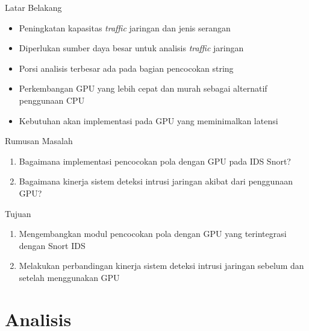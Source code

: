 \documentclass[10pt,xcolor=table]{beamer}
\begin{document}
\begin{frame}[fragile]{Latar Belakang}
    \begin{itemize}

        \item Peningkatan kapasitas \emph{traffic} jaringan dan jenis serangan

        \item Diperlukan sumber daya besar untuk analisis \emph{traffic} jaringan

        \item Porsi analisis terbesar ada pada bagian pencocokan string

        \item Perkembangan GPU yang lebih cepat dan murah sebagai alternatif penggunaan CPU
        \item Kebutuhan akan implementasi pada GPU yang meminimalkan latensi

    \end{itemize}
\end{frame}

\begin{frame}[fragile]{Rumusan Masalah}
    \begin{enumerate}

        \item Bagaimana implementasi pencocokan pola dengan GPU pada IDS Snort?

        \item Bagaimana kinerja sistem deteksi intrusi jaringan akibat dari penggunaan GPU?

    \end{enumerate}
\end{frame}

\begin{frame}[fragile]{Tujuan}
    \begin{enumerate}
        
        \item Mengembangkan modul pencocokan pola dengan GPU yang terintegrasi dengan Snort IDS
        
        \item Melakukan perbandingan kinerja sistem deteksi intrusi jaringan sebelum dan setelah menggunakan GPU

    \end{enumerate}
\end{frame}

\section{Analisis}
\end{document}
